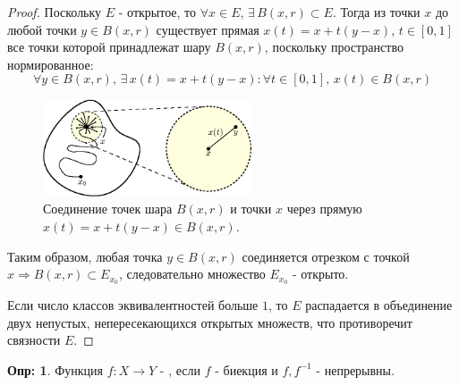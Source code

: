 \documentclass[12pt]{article}
\theoremstyle{definition}
\newtheorem{defn}{Опр:}
\begin{document}
\begin{proof}
	Поскольку $E$ - открытое, то $\forall x \in E, \, \exists \, B(x,r) \subset E $. Тогда из точки $x$ до любой точки $y \in B(x,r)$ существует прямая $x(t) = x + t(y -x), \, t\in [0,1]$ все точки которой принадлежат шару $B(x,r)$, поскольку пространство нормированное: 
	$$
		\forall y \in B(x,r), \, \exists \, x(t) = x + t(y -x) \colon \forall t \in [0,1], \, x(t) \in B(x,r)
	$$
	\begin{figure}[H]
		\centering
		\includegraphics[width=0.55\textwidth]{11_3.eps}
		\caption{Соединение точек шара $B(x,r)$ и точки $x$ через прямую $x(t) = x + t(y-x) \in B(x,r)$.}
		\label{11_3}
	\end{figure}
	Таким образом, любая точка $y \in B(x,r)$ соединяется отрезком с точкой $x \Rightarrow B(x,r) \subset E_{x_0}$, следовательно множество $E_{x_0}$ - открыто. 
	
	Если число классов эквивалентностей больше $1$, то $E$ распадается в объединение двух непустых, непересекающихся открытых множеств, что противоречит связности $E$.	
\end{proof}
\begin{defn}
	Функция $f \colon X \to Y$ - , если $f$ - биекция и $f,f^{-1}$ - непрерывны.
\end{defn}
\end{document}
